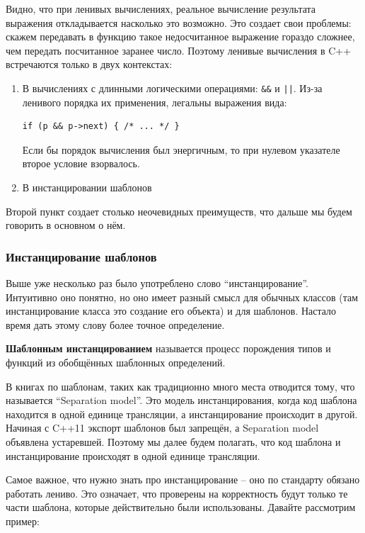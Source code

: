 \documentclass[a4paper,12pt,oneside]{article}
\begin{document}
Видно, что при ленивых вычислениях, реальное вычисление результата выражения откладывается насколько это возможно. Это создает свои проблемы: скажем передавать в функцию такое недосчитанное выражение гораздо сложнее, чем передать посчитанное заранее число. Поэтому ленивые вычисления в C++ встречаются только в двух контекстах:

\begin{enumerate}
\item В вычислениях с длинными логическими операциями: \lstinline!&&! и \lstinline!||!. Из-за ленивого порядка их применения, легальны выражения вида:
\begin{lstlisting}
if (p && p->next) { /* ... */ }
\end{lstlisting}
Если бы порядок вычисления был энергичным, то при нулевом указателе второе условие взорвалось.
\item В инстанцировании шаблонов
\end{enumerate}

Второй пункт создает столько неочевидных преимуществ, что дальше мы будем говорить в основном о нём.

\subsubsection{Инстанцирование шаблонов}

Выше уже несколько раз было употреблено слово ``инстанцирование''. Интуитивно оно понятно, но оно имеет разный смысл для обычных классов (там инстанцирование класса это создание его объекта) и для шаблонов. Настало время дать этому слову более точное определение.

\textbf{Шаблонным инстанцированием} называется процесс порождения типов и функций из обобщённых шаблонных определений.

В книгах по шаблонам, таких как \cite{vandervoord} традиционно много места отводится тому, что называется ``Separation model''. Это модель инстанцирования, когда код шаблона находится в одной единице трансляции, а инстанцирование происходит в другой. Начиная с C++11 \cite{stdcpp11} экспорт шаблонов был запрещён, а Separation model объявлена устаревшей. Поэтому мы далее будем полагать, что код шаблона и инстанцирование происходят в одной единице трансляции.

Самое важное, что нужно знать про инстанцирование -- оно по стандарту обязано работать лениво. Это означает, что проверены на корректность будут только те части шаблона, которые действительно были использованы. Давайте рассмотрим пример:
\end{document}
